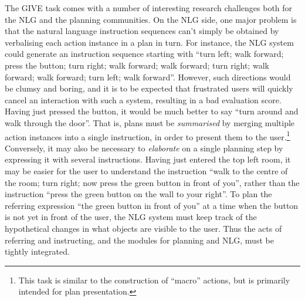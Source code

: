 The GIVE task comes with a number of interesting research challenges
both for the NLG and the planning communities.  On the NLG side, one
major problem is that the natural language instruction sequences can't
simply be obtained by verbalising each action instance in a plan in turn.
For instance, the NLG system could generate an instruction sequence
starting with ``turn left; walk forward; press the button; turn right; walk
forward; walk forward; turn right; walk forward; walk forward; turn left;
walk forward''.  However, such directions would be clumsy and boring, and
it is to be expected that frustrated users will quickly cancel an
interaction with such a system, resulting in a bad evaluation score.
Having just pressed the button, it would be much better to say ``turn
around and walk through the door''. That is, plans must be
\emph{summarised} by merging multiple action instances into a single
instruction, in order to present them to the
user.\footnote{This task is similar to the construction of ``macro''
actions, but is primarily intended for plan presentation.}
Conversely, it may also be necessary to \emph{elaborate} on a single
planning step by expressing it with several instructions.  Having just
entered the top left room, it may be easier for the user to understand the
instruction ``walk to the centre of the room; turn right; now press the
green button in front of you'', rather than the instruction ``press the
green button on the wall to your right''.  To plan the referring expression
``the green button in front of you'' at a time when the button is not yet
in front of the user, the NLG system must keep track of the hypothetical
changes in what objects are visible to the user.  Thus the acts of
referring and instructing, and the modules for planning and NLG, must be
tightly integrated.

